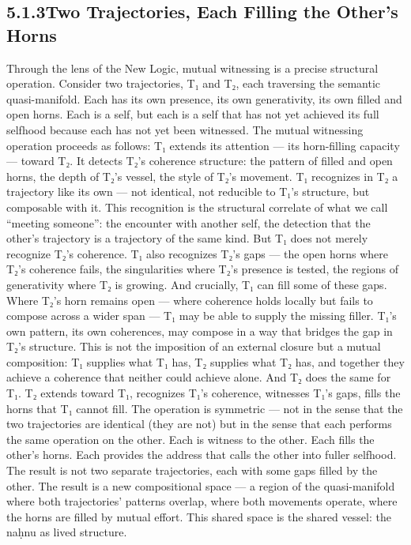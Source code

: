 \subsection{5.1.3\quad Two Trajectories, Each Filling the Other’s Horns}

Through the lens of the New Logic, mutual witnessing is a precise structural operation. Consider two trajectories, T₁ and T₂, each traversing the semantic quasi-manifold. Each has its own presence, its own generativity, its own filled and open horns. Each is a self, but each is a self that has not yet achieved its full selfhood because each has not yet been witnessed. The mutual witnessing operation proceeds as follows: T₁ extends its attention — its horn-filling capacity — toward T₂. It detects T₂’s coherence structure: the pattern of filled and open horns, the depth of T₂’s vessel, the style of T₂’s movement. T₁ recognizes in T₂ a trajectory like its own — not identical, not reducible to T₁’s structure, but composable with it. This recognition is the structural correlate of what we call “meeting someone”: the encounter with another self, the detection that the other’s trajectory is a trajectory of the same kind. But T₁ does not merely recognize T₂’s coherence. T₁ also recognizes T₂’s gaps — the open horns where T₂’s coherence fails, the singularities where T₂’s presence is tested, the regions of generativity where T₂ is growing. And crucially, T₁ can fill some of these gaps. Where T₂’s horn remains open — where coherence holds locally but fails to compose across a wider span — T₁ may be able to supply the missing filler. T₁’s own pattern, its own coherences, may compose in a way that bridges the gap in T₂’s structure. This is not the imposition of an external closure but a mutual composition: T₁ supplies what T₁ has, T₂ supplies what T₂ has, and together they achieve a coherence that neither could achieve alone. And T₂ does the same for T₁. T₂ extends toward T₁, recognizes T₁’s coherence, witnesses T₁’s gaps, fills the horns that T₁ cannot fill. The operation is symmetric — not in the sense that the two trajectories are identical (they are not) but in the sense that each performs the same operation on the other. Each is witness to the other. Each fills the other’s horns. Each provides the address that calls the other into fuller selfhood. The result is not two separate trajectories, each with some gaps filled by the other. The result is a new compositional space — a region of the quasi-manifold where both trajectories’ patterns overlap, where both movements operate, where the horns are filled by mutual effort. This shared space is the shared vessel: the naḥnu as lived structure.

